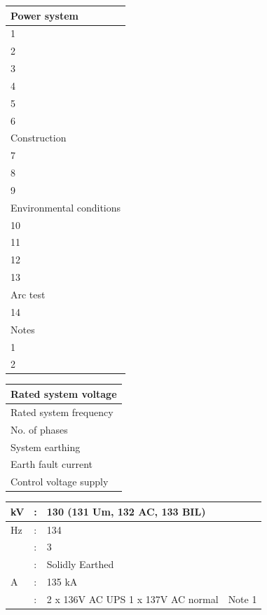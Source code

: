 \documentclass[11pt,a4paper]{article}
\begin{document}
\begin{table}[h]
\begin{tabular}{|l|}
\hline
Power system \\ \hline
1 \\ \hline
2 \\ \hline
3 \\ \hline
4 \\ \hline
5 \\ \hline
6 \\ \hline
Construction \\ \hline
7 \\ \hline
8 \\ \hline
9 \\ \hline
Environmental conditions \\ \hline
10 \\ \hline
11 \\ \hline
12 \\ \hline
13 \\ \hline
Arc test \\ \hline
14 \\ \hline
Notes \\ \hline
1 \\ \hline
2 \\ \hline
\end{tabular}
\end{table}

\begin{table}[h]
\begin{tabular}{|l|}
\hline
Rated system voltage \\ \hline
Rated system frequency \\ \hline
No. of phases \\ \hline
System earthing \\ \hline
Earth fault current \\ \hline
Control voltage supply \\ \hline
\end{tabular}
\end{table}

\begin{table}[h]
\begin{tabular}{|l|l|l|l|}
\hline
kV & : & 130 (131 Um, 132 AC, 133 BIL) &  \\ \hline
Hz & : & 134 &  \\ \hline
  & : & 3 &  \\ \hline
 & : & Solidly Earthed &  \\ \hline
A & : & 135 kA &  \\ \hline
  & : & 2 x 136V AC UPS 1 x 137V AC normal & Note 1 \\ \hline
\end{tabular}
\end{table}
\end{document}
